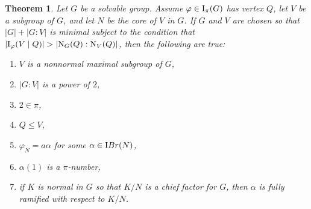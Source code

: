 \documentclass[12pt]{article}
\newtheorem{theorem}{Theorem}%
\def\ibr#1{{\textrm IBr} (#1)}
\def\norm#1#2{{\textrm N}_{#1} (#2)}
\def\I#1#2{{\textrm I}_{#1} (#2)}
\def\Ipi#1{\I {\pi}{#1}}
\def\phi{\varphi}
\newcommand \IIpi[3] {{\textrm I}_{#1} (#2 \mid #3)}
\begin{document}
\begin{theorem} \label{min counter}
Let $G$ be a solvable group.  Assume $\phi \in \Ipi G$ has vertex
$Q$, let $V$ be a subgroup of $G$, and let $N$ be the core of $V$ in
$G$. If $G$ and $V$ are chosen so that $|G| + |G:V|$ is minimal
subject to the condition that $|\IIpi {\phi}VQ| > |\norm GQ:\norm
VQ|$, then the following are true:

\begin{enumerate}
\item $V$ is a nonnormal maximal subgroup of $G$,
\item $|G:V|$ is a power of $2$,
\item $2 \in \pi$,
\item $Q \le V$,
\item $\phi_N = a \alpha$ for some $\alpha \in \ibr N$,
\item $\alpha (1)$ is a $\pi$-number,
\item if $K$ is normal in $G$ so that $K/N$ is a chief factor for
$G$, then $\alpha$ is fully ramified with respect to $K/N$.
\end{enumerate}
\end{theorem}
\end{document}
